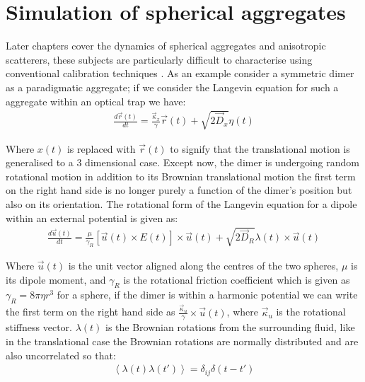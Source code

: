 \section{Simulation of spherical aggregates}
\label{sec:simulations}
Later chapters cover the dynamics of spherical aggregates and anisotropic 
scatterers, these subjects are particularly difficult to characterise 
using conventional calibration techniques \cite{Li2008, Yogesha2011PreciseCO}. 
As an example consider a symmetric dimer as a paradigmatic aggregate; 
if we consider the Langevin equation for such a aggregate within an optical 
trap we have:
\begin{align}
\frac{{d}\vec{r}(t)}{{dt}} = \frac{\vec{\kappa}_x}{\gamma}\vec{r}(t) + \sqrt{2\vec{D}_x}\eta(t)
\end{align}

Where $x(t)$ is replaced with $\vec{r}(t)$ to signify that the translational 
motion is generalised to a 3 dimensional case. Except now, the dimer 
is undergoing random rotational motion in addition to its Brownian 
translational motion the first term on the right hand side is no longer 
purely a function of the dimer's position but also on its orientation. 
The rotational form of the Langevin equation for a dipole within an external 
potential is given as:
\begin{align}
  \frac{{d}\vec{u}(t)}{{dt}}
  =
  \frac{\mu}{\gamma_R}\left[\vec{u}(t)\times E(t)\right]\times \vec{u}(t)
  + \sqrt{2\vec{D}_R}\lambda(t)\times \vec{u}(t)
\end{align}

Where $\vec{u}(t)$ is the unit vector aligned along the centres of the 
two spheres, $\mu$ is its dipole moment, and $\gamma_R$ is the rotational 
friction coefficient which is given as $\gamma_R = 8\pi\eta r^3$ for a 
sphere, if the dimer is within a harmonic potential we can write the first 
term on the right hand side as $\frac{\vec{\kappa}_u}{\gamma} \times 
\vec{u}(t)$, where $\vec{\kappa}_u$ is the rotational stiffness vector. 
$\lambda(t)$ is the Brownian rotations from the surrounding fluid, 
like in the translational case the Brownian rotations are normally 
distributed and are also uncorrelated so that:
\begin{align}
  \left<\lambda(t)\lambda(t')\right> = \delta_{ij}\delta(t-t')
\end{align}

